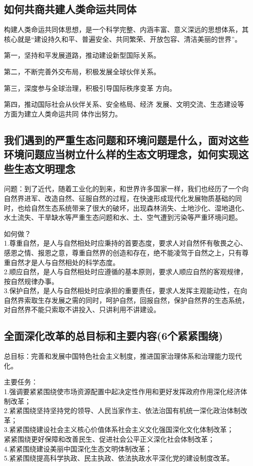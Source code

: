 \documentclass[cn,11pt]{elegantbook}
\begin{document}
\subsection{如何共商共建人类命运共同体}
{\large
构建人类命运共同体思想，是一个科学完整、内涵丰富、意义深远的思想体系，其核心就是“建设持久和平、普遍安全、共同繁荣、开放包容、清洁美丽的世界”。

第一，坚持和平发展道路，推动建设新型国际关系。

第二，不断完善外交布局，积极发展全球伙伴关系。

第三，深度参与全球治理，积极引导国际秩序变革
方向。

第四，推动国际社会从伙伴关系、安全格局、经济
发展、文明交流、生态建设等方面为建立人类命运共同
体作出努力。

}

\subsection{我们遇到的严重生态问题和环境问题是什么，面对这些环境问题应当树立什么样的生态文明理念，如何实现这些生态文明理念
}
{\large 
{\heiti 问题：}到了近代，随着工业化的到来，和世界许多国家一样，我们也经历了一个向自然界进军、改造自然、征服自然的过程，在快速形成现代化发展物质基础的同时，也给自然生态系统带来了很大的破坏，出现森林消失、土地沙化、湿地退化、水土流失、干旱缺水等严重生态问题和水、土、空气遭到污染等严重环境问题。

{\heiti 如何做？}\\1.尊重自然，是人与自然相处时应秉持的首要态度，要求人对自然怀有敬畏之心、感恩之情、报恩之意，尊重自然界的创造和存在，绝不能凌驾于自然之上，只有尊重自然才是人与自然相处的科学态度。\\2.顺应自然，是人与自然相处时应遵循的基本原则，要求人顺应自然的客观规律，按自然规律办事。\\3.保护自然，是人与自然相处时应承担的重要责任，要求人发挥主观能动性，在向自然界索取生存发展之需的同时，呵护自然，回报自然，保护自然界的生态系统，对自然界不能只索取不讲投入、只讲利用不讲建设。
}
\subsection{全面深化改革的总目标和主要内容(6个紧紧围绕)}
{\large 
{\heiti 总目标：}完善和发展中国特色社会主义制度，推进国家治理体系和治理能力现代化。

{\heiti 主要任务：}\\
1.强调要紧紧围绕使市场资源配置中起决定性作用和更好发挥政府作用深化经济体制改革；\\2.紧紧围绕坚持坚持党的领导、人民当家作主、依法治国有机统一深化政治体制改革；\\3.紧紧围绕建设社会主义核心价值体系社会主义文化强国深化文化体制改革；\\紧紧围绕更好保障和改善民生、促进社会公平正义深化社会体制改革；\\4.紧紧围绕建设美丽中国深化生态文明体制改革；\\5.紧紧围绕提高科学执政、民主执政、依法执政水平深化党的建设制度改革。


}
\end{document}
